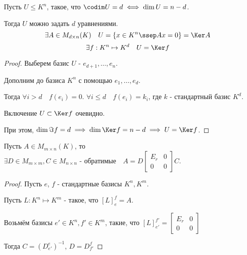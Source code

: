 \begin{theorem} \thmslashn

    Пусть $U \le K^{n}$, такое, что $\codim U = d \iff \dim U = n - d$.

    Тогда $U$ можно задать $d$ уравнениями.
    \begin{equation*}
        \exists{A\in M_{d \times n}(K)}\quad U = \{x\in K^{n}\ssep Ax = 0\} = \Ker A 
    \end{equation*}
    \begin{equation*}
        \exists{f : K^{n} \mapsto K^{d}}\quad U = \Ker f 
    \end{equation*}
    \begin{proof} \thmslashn
    
        Выберем базис $U$ - $e_{d+1}, \ldots, e_{n}$.

        Дополним до базиса $K^{n}$ с помощью $e_1, \ldots, e_{d}$.

        Тогда $\forall{i > d}\quad f(e_{i}) = 0$. $\forall{i \le d}\quad f(e_{i}) = k_{i}$, где $k$ - стандартный базис $K^{d}$.

        Включение $U \subset \Ker f$ очевидно.

        При этом, $\dim \Im f = d \implies \dim \Ker f = n - d \implies U = \Ker f$.
    \end{proof}
\end{theorem}
\begin{theorem} \thmslashn

    Пусть $A\in M_{m \times n}(K)$, то $\exists{D\in M_{m \times m}, C\in M_{n \times n} \text{ - обратимые}}\quad A = D \begin{bmatrix} E_{r} & 0\\ 0 & 0 \end{bmatrix}C $.
    \begin{proof} \thmslashn
    
        Пусть $e$, $f$ - стандартные базисы $K^{n}, K^{m}$.

        Пусть $L : K^{n} \mapsto K^{m}$ - такое, что $[L]_{e}^{f} = A$.

        Возьмём базисы $e'\in K^{n}, f'\in K^{m}$, такие, что $[L]_{e'}^{f'} = \begin{bmatrix} E_{r} & 0\\ 0 & 0 \end{bmatrix} $

        Тогда $C = (D_{e'}^{e})^{-1}$, $D = D_{f'}^{f}$

    \end{proof}
\end{theorem}
